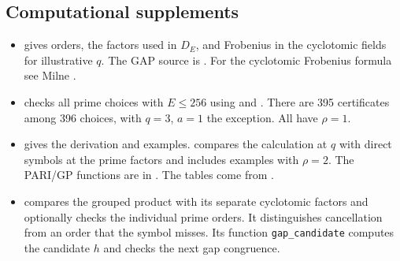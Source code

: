 \documentclass[11pt]{article}
\begin{document}
\subsection{Computational supplements}

\begin{itemize}
\item {} gives orders, the factors used in $D_E$,
and Frobenius in the cyclotomic fields for illustrative $q$.
The GAP source is . For the cyclotomic
Frobenius formula see Milne \cite{MilneANT}.
\item {} checks all prime choices with
$E\le256$ using  and
. There are 395 certificates among
396 choices, with $q=3$, $a=1$ the exception. All have $\rho=1$.
\item {} gives the derivation and examples.
 compares the calculation at $q$
with direct symbols at the prime factors and includes examples
with $\rho=2$. The PARI/GP functions are in
. The tables come from
.
\item {} compares the grouped
product with its separate cyclotomic factors and optionally checks
the individual prime orders. It distinguishes cancellation from
an order that the symbol misses. Its function \texttt{gap\_candidate}
computes the candidate $h$ and checks the next gap congruence.
\end{itemize}
\end{document}
